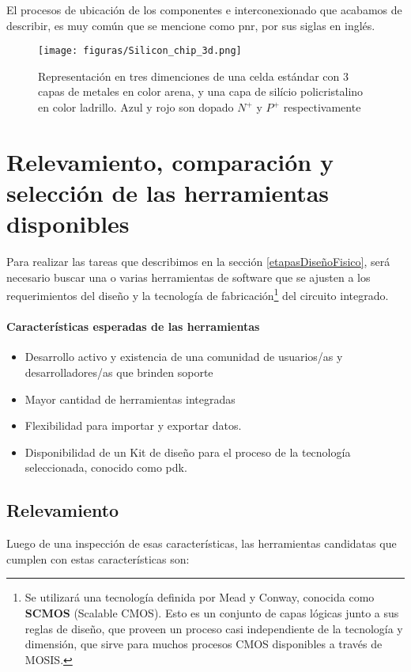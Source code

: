 El procesos de ubicación de los componentes e interconexionado que acabamos de describir, es muy común que se mencione como \gls{pnr}, por sus siglas en inglés.



\begin{figure}[h]
\centering
\texttt{[image: figuras/Silicon\_chip\_3d.png]}
  \caption{Representación en tres dimenciones de una celda estándar con 3 capas de metales en color arena, y una capa de silício policristalino en color ladrillo. Azul y rojo son dopado $N^+$ y $P^+$ respectivamente}
  \label{fig:routing}
\end{figure}

\section{Relevamiento, comparación y selección de las herramientas disponibles}\label{sec:herramientasDisponibles}
Para realizar las tareas que describimos en la sección \ref{etapasDiseñoFisico}, será necesario buscar una o varias herramientas de software que se ajusten a los requerimientos del diseño y la tecnología de fabricación\footnote{Se utilizará una tecnología definida por Mead y Conway\cite{mead-conway80}, conocida como  \textbf{SCMOS} (Scalable CMOS).
Esto es un conjunto de capas lógicas junto a sus reglas de diseño, que proveen un proceso casi independiente de la tecnología y dimensión, que sirve para muchos procesos CMOS disponibles a través de MOSIS.} del circuito integrado.

\paragraph{Características esperadas de las herramientas}
\begin{itemize}
\item Desarrollo activo y existencia de una comunidad de usuarios/as y desarrolladores/as que brinden soporte
\item Mayor cantidad de herramientas integradas
\item Flexibilidad para importar y exportar datos. 
\item Disponibilidad de un Kit de diseño para el proceso de la tecnología seleccionada, conocido como \gls{pdk}.
\end{itemize}

\subsection{Relevamiento}
Luego de una inspección de esas características, las herramientas candidatas que cumplen con estas características son:

